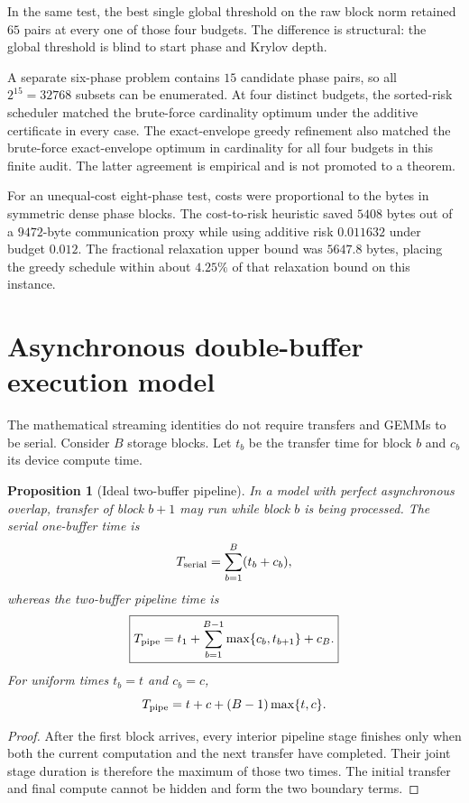 \documentclass[11pt]{article}
\newtheorem{proposition}[theorem]{Proposition}
\theoremstyle{definition}
\theoremstyle{remark}
\begin{document}
In the same test, the best single global threshold on the raw block norm
retained $65$ pairs at every one of those four budgets.  The difference is
structural: the global threshold is blind to start phase and Krylov depth.

A separate six-phase problem contains $15$ candidate phase pairs, so all
$2^{15}=32768$ subsets can be enumerated.  At four distinct budgets, the
sorted-risk scheduler matched the brute-force cardinality optimum under the
additive certificate in every case.  The exact-envelope greedy refinement also
matched the brute-force exact-envelope optimum in cardinality for all four
budgets in this finite audit.  The latter agreement is empirical and is not
promoted to a theorem.

For an unequal-cost eight-phase test, costs were proportional to the bytes in
symmetric dense phase blocks.  The cost-to-risk heuristic saved $5408$ bytes
out of a $9472$-byte communication proxy while using additive risk $0.011632$
under budget $0.012$.  The fractional relaxation upper bound was $5647.8$
bytes, placing the greedy schedule within about $4.25\%$ of that relaxation
bound on this instance.

\section{Asynchronous double-buffer execution model}
\label{sec:double-buffer}

The mathematical streaming identities do not require transfers and GEMMs to be
serial.  Consider $B$ storage blocks.  Let $t_b$ be the transfer time for block
$b$ and $c_b$ its device compute time.

\begin{proposition}[Ideal two-buffer pipeline]\label{claim:final-17-1}
In a model with perfect asynchronous overlap, transfer of block $b+1$ may run
while block $b$ is being processed.  The serial one-buffer time is
\[
T_{\rm serial}=\sum_{b=1}^{B}(t_b+c_b),
\]
whereas the two-buffer pipeline time is
\[
\boxed{
T_{\rm pipe}
=
t_1
+
\sum_{b=1}^{B-1}\max\{c_b,t_{b+1}\}
+
c_B.
}
\]
For uniform times $t_b=t$ and $c_b=c$,
\[
T_{\rm pipe}=t+c+(B-1)\max\{t,c\}.
\]
\end{proposition}

\begin{proof}
After the first block arrives, every interior pipeline stage finishes only when
both the current computation and the next transfer have completed.  Their
joint stage duration is therefore the maximum of those two times.  The initial
transfer and final compute cannot be hidden and form the two boundary terms.
\end{proof}
\end{document}
